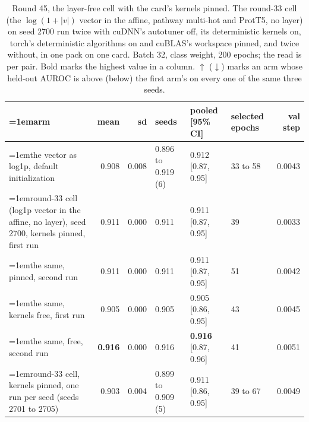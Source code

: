 \begin{table}[H]
  \centering
  \scriptsize
  \setlength{\tabcolsep}{2.5pt}
  \caption[Round 45, the layer-free cell with the card's kernels pinned]{Round 45, the layer-free cell with the card's kernels pinned. The round-33 cell (the $\log(1 + |v|)$ vector in the affine, pathway multi-hot and ProtT5, no layer) on seed 2700 run twice with cuDNN's autotuner off, its deterministic kernels on, torch's deterministic algorithms on and cuBLAS's workspace pinned, and twice without, in one pack on one card. Batch 32, class weight, 200 epochs; the read is per pair. Bold marks the highest value in a column. $\uparrow$ ($\downarrow$) marks an arm whose held-out AUROC is above (below) the first arm's on every one of the same three seeds.}
  \label{tab:w61}
  \begin{tabular}{@{}>{\raggedright\hangindent=1em\hangafter=1\arraybackslash}p{84.4mm}rrlllr@{}}
    \hline
    arm & mean & sd & seeds & pooled [95\% CI] & selected epochs & val step \\
    \hline
    the vector as log1p, default initialization & 0.908 & 0.008 & 0.896 to 0.919 (6) & 0.912 [0.87, 0.95] & 33 to 58 & 0.0043 \\
    round-33 cell (log1p vector in the affine, no layer), seed 2700, kernels pinned, first run & 0.911 & 0.000 & 0.911 & 0.911 [0.87, 0.95] & 39 & 0.0033 \\
    the same, pinned, second run & 0.911 & 0.000 & 0.911 & 0.911 [0.87, 0.95] & 51 & 0.0042 \\
    the same, kernels free, first run & 0.905 & 0.000 & 0.905 & 0.905 [0.86, 0.95] & 43 & 0.0045 \\
    the same, free, second run & \textbf{0.916} & 0.000 & 0.916 & \textbf{0.916} [0.87, 0.96] & 41 & 0.0051 \\
    round-33 cell, kernels pinned, one run per seed (seeds 2701 to 2705) & 0.903 & 0.004 & 0.899 to 0.909 (5) & 0.911 [0.86, 0.95] & 39 to 67 & 0.0049 \\
    \hline
  \end{tabular}
\end{table}
